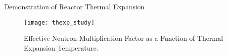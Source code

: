 \begin{frame}{Demonstration of Reactor Thermal Expansion}
  \begin{figure}
    \centering
    \texttt{[image: thexp\_study]}
    \caption{Effective Neutron Multiplication Factor as a Function of 
      Thermal Expansion Temperature.}
    \label{fig:thexp_study}
  \end{figure}
\end{frame}
